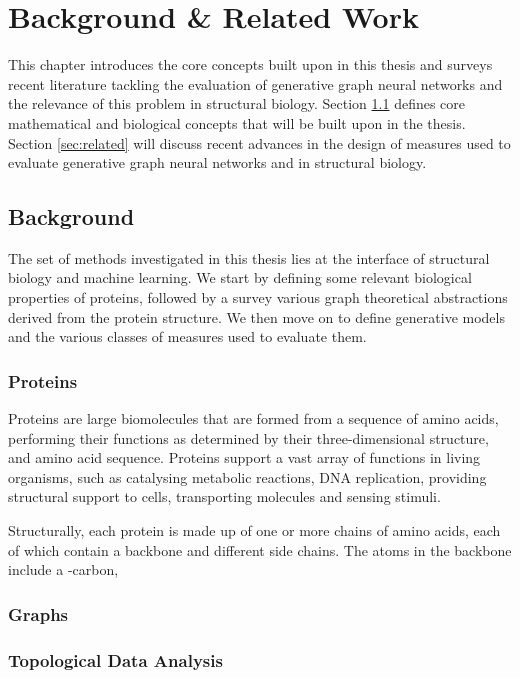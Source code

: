 \chapter{Background \& Related Work}

This chapter introduces the core concepts built upon in this thesis and surveys
recent literature tackling the evaluation of generative graph neural networks
and the relevance of this problem in structural biology. Section
\ref{sec:background} defines core mathematical and biological concepts that will
be built upon in the thesis. Section \ref{sec:related} will discuss recent
advances in the design of measures used to evaluate generative graph neural
networks and in structural biology.

\section{Background}\label{sec:background}

The set of methods investigated in this thesis lies at the interface of
structural biology and machine learning. We start by defining some relevant
biological properties of proteins, followed by a survey various graph theoretical
abstractions derived from the protein structure. We then move on to define
generative models and the various classes of measures used to evaluate them.

\subsection{Proteins}

Proteins are large biomolecules that are formed from a sequence of amino acids,
performing their functions as determined by their three-dimensional structure, and amino
acid sequence. Proteins support a vast array of functions in living organisms,
such as catalysing metabolic reactions, DNA replication, providing structural
support to cells, transporting molecules and sensing stimuli.

Structurally, each protein is made up of one or more chains of amino acids,
each of which contain a backbone and different side chains. The atoms in the
backbone include a \textalpha-carbon,

\subsection{Graphs}

\subsection{Topological Data Analysis}

